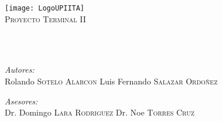 \documentclass[
	12pt, %
	spanish, %
	es-tabla,
	singlespacing, %
	headsepline, %
	]{MastersDoctoralThesis} %
\author{} %
\begin{document}
%
\frontmatter %

\pagestyle{plain} %


\begin{titlepage}
\begin{center}

{\scshape\LARGE \univname\par}\vspace{1cm} %
\texttt{[image: LogoUPIITA]}\\ %
\vspace*{.03\textheight}
\textsc{\Large Proyecto Terminal II}\\[0.7cm] %

\HRule \\[0.4cm] %
{\huge \bfseries \ttitle\par}\vspace{0.4cm} %
\HRule \\[0.4cm] %

\begin{minipage}[t]{0.4\textwidth}
\begin{flushleft} \large
\emph{Autores:}\\
Rolando \textsc{Sotelo Alarcon} \newline
Luis Fernando \textsc{Salazar Ordoñez} \newline
\end{flushleft}
\end{minipage}
\begin{minipage}[t]{0.4\textwidth}
\begin{flushright} \large
\emph{Asesores:} \\
Dr. Domingo \textsc{Lara Rodriguez} \newline
Dr. Noe \textsc{Torres Cruz}
\end{flushright}
\end{minipage}\\[1cm]
 
\vfill


\end{center}
\end{titlepage}
\end{document}
